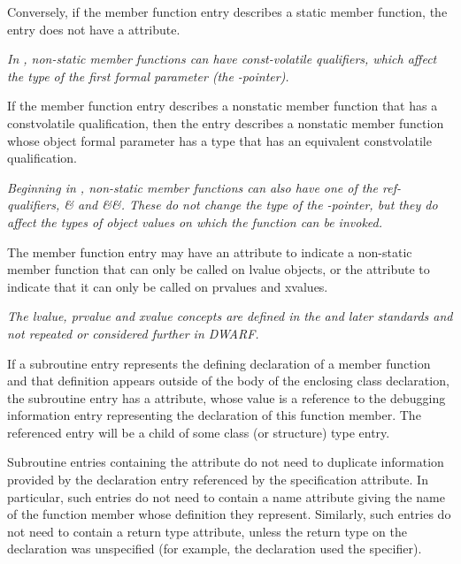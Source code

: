 Conversely, if the member function entry describes a static
member function, the entry does not have 
a 
\DWATobjectpointer{}
attribute.

\textit{In , non-static member functions can have const-volatile
qualifiers, which affect the type of the first formal parameter (the
-pointer).}
 
If the member function entry describes a non\dash static member
function that has a const\dash volatile qualification, then
the entry describes a non\dash static member function whose
object formal parameter has a type that has an equivalent
const\dash volatile qualification.

\textit{Beginning in , non-static member 
functions can also have one of the ref-qualifiers, \& and \&\&. 
These do not change the type of the
-pointer, but they do affect the types of 
object values on which the function can be invoked.}

The member function entry may have an \DWATreferenceDEFN{} attribute
to indicate a non-static member function that can only be called on
lvalue objects, or the \DWATrvaluereferenceDEFN{} attribute 
to indicate that it can only be called on prvalues and xvalues.

\textit{The lvalue, prvalue and xvalue concepts are defined in the
 and later standards and not repeated or
considered further in DWARF.}

If a subroutine entry represents the defining declaration
of a member function and that definition appears outside of
the body of the enclosing class declaration, the subroutine
entry has a 
\DWATspecification{} attribute, 
whose value is
a reference to the debugging information entry representing
the declaration of this function member. The referenced entry
will be a child of some class (or structure) type entry.

Subroutine entries containing the
\DWATspecification{} attribute 
do not need to duplicate information provided
by the declaration entry referenced by the specification
attribute. In particular, such entries do not need to contain
a name attribute giving the name of the function member whose 
definition they represent.  
Similarly, such entries do not need to contain a return type 
attribute, unless the return type on the declaration was 
unspecified (for example, the declaration used the 
 \autoreturntype{} specifier).

